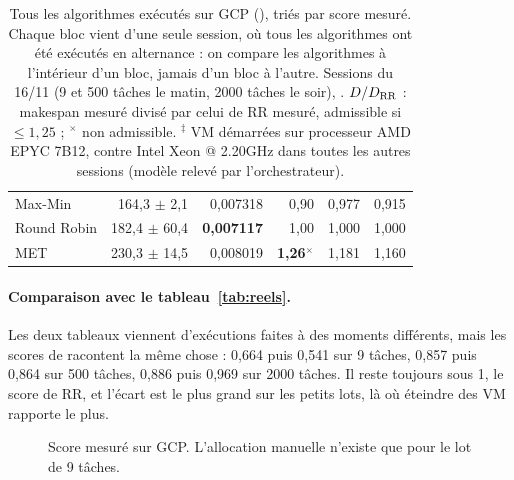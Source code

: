 \begin{table}[H]
\begin{tabular}{lrrrrr}
Max-Min                   & 164,3 $\pm$ 2,1  & 0,007318 & 0,90 & 0,977 & 0,915 \\
Round Robin               & 182,4 $\pm$ 60,4 & \textbf{0,007117} & 1,00 & 1,000 & 1,000 \\
MET                       & 230,3 $\pm$ 14,5 & 0,008019 & \textbf{1,26}$^{\times}$ & 1,181 & 1,160 \\
\bottomrule
\end{tabular}
\caption{Tous les algorithmes exécutés sur GCP (\mesure{}), triés par score
mesuré. Chaque bloc vient d'une seule session, où tous les algorithmes ont été
exécutés en alternance : on compare les algorithmes à l'intérieur d'un bloc,
jamais d'un bloc à l'autre. Sessions du 16/11 (9 et 500 tâches le matin, 2000 tâches le soir),
. $D/D_{\mathrm{RR}}$ : makespan mesuré divisé par celui de
RR mesuré, admissible si $\le 1{,}25$ ; $^{\times}$ non admissible.
$^{\ddagger}$ VM démarrées sur processeur AMD EPYC 7B12, contre Intel Xeon @ 2.20GHz dans toutes les autres sessions (modèle relevé par l'orchestrateur).}
\label{tab:reels_tous}
\end{table}

\paragraph{Comparaison avec le tableau~\ref{tab:reels}.} Les deux tableaux
viennent d'exécutions faites à des moments différents, mais les scores de \sel{}
racontent la même chose : 0,664 puis 0,541 sur 9 tâches, 0,857 puis 0,864 sur
500 tâches, 0,886 puis 0,969 sur 2000 tâches. Il reste toujours sous 1, le score
de RR, et l'écart est le plus grand sur les petits lots, là où éteindre des VM
rapporte le plus.

\begin{figure}[H]
\centering
{}
\caption{Score mesuré sur GCP. L'allocation manuelle n'existe que pour le lot de 9 tâches.}
\label{fig:reels_tous}
\end{figure}

